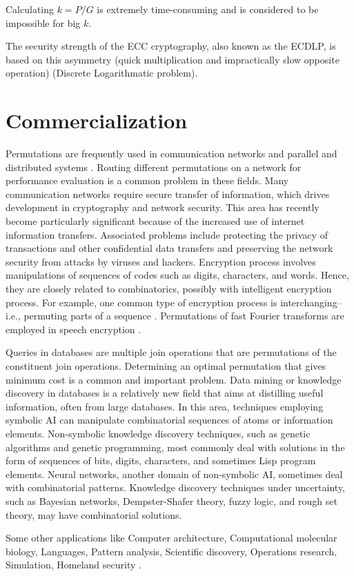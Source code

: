 \documentclass{article}
\begin{document}
Calculating $k=P/G$ is extremely time-consuming and is considered to be impossible for big $k$.

The security strength of the ECC cryptography, also known as the ECDLP, is based on this asymmetry (quick multiplication and impractically slow opposite operation) (Discrete Logarithmatic problem).
\section{Commercialization}
Permutations are frequently used in communication networks and parallel and distributed systems . Routing different permutations on a network for performance evaluation is a common problem in these fields. Many communication networks require secure transfer of information, which drives development in cryptography and network security. This area has recently become particularly significant because of the increased use of internet information transfers. Associated problems include protecting the privacy of transactions and other confidential data transfers and preserving the network security from attacks by viruses and hackers. Encryption process involves manipulations of sequences of codes such as digits, characters, and words. Hence, they are closely related to combinatorics, possibly with intelligent encryption process. For example, one common type of encryption process is interchanging--i.e., permuting parts of a sequence . Permutations of fast Fourier transforms are employed in speech encryption . 

Queries in databases are multiple join operations that are permutations of the constituent join operations. Determining an optimal permutation that gives minimum cost is a common and important problem. Data mining or knowledge discovery in databases is a relatively new field that aims at distilling useful information, often from large databases. In this area, techniques employing symbolic AI can manipulate combinatorial sequences of atoms or information elements. Non-symbolic knowledge discovery techniques, such as genetic algorithms and genetic programming, most commonly deal with solutions in the form of sequences of bits, digits, characters, and sometimes Lisp program elements. Neural networks, another domain of non-symbolic AI, sometimes deal with combinatorial patterns. Knowledge discovery techniques under uncertainty, such as Bayesian networks, Dempster-Shafer theory, fuzzy logic, and rough set theory, may have combinatorial solutions.

Some other applications like Computer architecture, Computational molecular biology, Languages, Pattern analysis, Scientific discovery, Operations research, Simulation, Homeland security .
\end{document}
